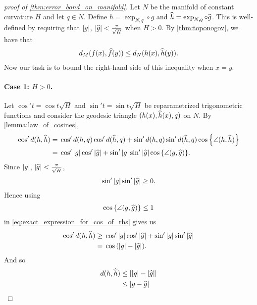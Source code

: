\documentclass[english, a4paper, 12pt]{article}
\begin{document}
\begin{proof}[proof of \cref{thm:error_bond_on_manifold}]
	Let $N$ be the manifold of constant curvature $H$ and let $q \in N$.
	Define $h = \operatorname{exp}_{N, q} \circ g$ and $\widehat{h} = \operatorname{exp}_{N, q} \circ \widehat{g}$.
	This is well-defined by requiring that $\abs{g}$, $\abs{\widehat{g}} < \frac{\pi}{\sqrt{H}}$ when $H > 0$.
	By \cref{thm:toponogov}, we have that
	\begin{align}
		d_M(f(x), \widehat{f}(y)) \leq d_N(h(x), \widehat{h}(y)).
	\end{align}
	Now our task is to bound the right-hand side of this inequality when $x = y$.

	\paragraph{Case 1: $H > 0$.}
	Let $\cos'{t} = \cos{t \sqrt{H}}$ and $\sin'{t} = \sin{t \sqrt{H}}$ be reparametrized trigonometric functions and consider the geodesic triangle $(h(x), \widehat{h}(x), q)$ on $N$.
	By \cref{lemma:law_of_cosines},
	\begin{align}
		\cos'{d(h, \mathhat{h})} ={}&
			\cos'{d(h, q)} \cos'{d(\mathhat{h}, q)}
			+ \sin'{d(h, q)} \sin'{d(\mathhat{h}, q)} \cos{\left\{ \angle(h, \mathhat{h}) \right\}}\\
		={}&
			\cos'{\abs{g}} \cos'{\abs{\mathhat{g}}}
			+ \sin'{\abs{g}} \sin'{\abs{\mathhat{g}}} \cos{\left\{ \angle(g, \mathhat{g}) \right\}}.%
		\label{eq:exact_expression_for_cos_of_rhs}
	\end{align}
	Since $\abs{g}$, $\abs{\widehat{g}} < \frac{\pi}{\sqrt{H}}$,
	\begin{align}
		\sin'{\abs{g}} \sin'{\abs{\widehat{g}}} \geq 0.
	\end{align}
	Hence using
	\begin{align}
		\cos{\left\{ \angle(g, \widehat{g}) \right\}} \leq 1
	\end{align}
	in \cref{eq:exact_expression_for_cos_of_rhs} gives us
	\begin{align}
		\cos'{d(h, \widehat{h})} \geq{}&
			\cos'{\abs{g}} \cos'{\abs{\widehat{g}}}
			+ \sin'{\abs{g}} \sin'{\abs{\widehat{g}}}\\
		={}& \cos{(\abs{g} - \abs{\widehat{g}})}.
	\end{align}
	And so
	\begin{align}
		d(h, \widehat{h}) \leq{}& \abs{\abs{g} - \abs{\widehat{g}}}\\
		\leq{}& \abs{g - \widehat{g}}
	\end{align}
	

\end{proof}
\end{document}
